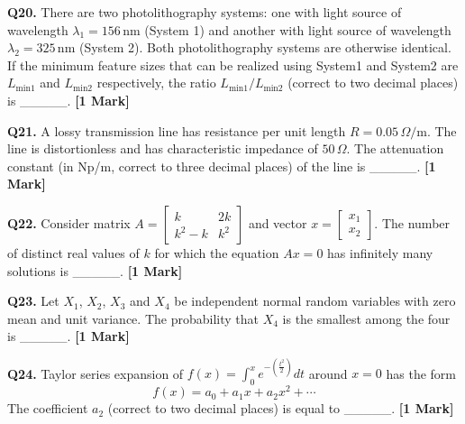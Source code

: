 \documentclass[11pt]{article}
\newcommand{\questiona}[2]{
    \noindent\textbf{Q#2.} #1 \hfill \textbf{[1 Mark]}
}
\begin{document}
\vspace{0.5cm}

\questiona{There are two photolithography systems: one with light source of wavelength $\lambda_1 = 156\,\text{nm}$ (System 1) and another with light source of wavelength $\lambda_2 = 325\,\text{nm}$ (System 2). Both photolithography systems are otherwise identical. If the minimum feature sizes that can be realized using System1 and System2 are $L_{\text{min1}}$ and $L_{\text{min2}}$ respectively, the ratio $L_{\text{min1}}/L_{\text{min2}}$ (correct to two decimal places) is \_\_\_\_\_.}{20}

\vspace{0.5cm}

\questiona{A lossy transmission line has resistance per unit length $R = 0.05\,\Omega/\text{m}$. The line is distortionless and has characteristic impedance of $50\,\Omega$. The attenuation constant (in Np/m, correct to three decimal places) of the line is \_\_\_\_\_.}{21}

\vspace{0.5cm}

\questiona{Consider matrix $A = \begin{bmatrix} k & 2k \\ k^2 - k & k^2 \end{bmatrix}$ and vector $x = \begin{bmatrix} x_1 \\ x_2 \end{bmatrix}$. The number of distinct real values of $k$ for which the equation $Ax = 0$ has infinitely many solutions is \_\_\_\_\_.}{22}

\vspace{0.5cm}

\questiona{Let $X_1$, $X_2$, $X_3$ and $X_4$ be independent normal random variables with zero mean and unit variance. The probability that $X_4$ is the smallest among the four is \_\_\_\_\_.}{23}

\vspace{0.5cm}

\questiona{Taylor series expansion of $f(x) = \int_{0}^{x} e^{-\left(\frac{t^2}{2}\right)} dt$ around $x = 0$ has the form
\[ f(x) = a_0 + a_1 x + a_2 x^2 + \cdots \]
The coefficient $a_2$ (correct to two decimal places) is equal to \_\_\_\_\_.}{24}

\vspace{0.5cm}
\end{document}
